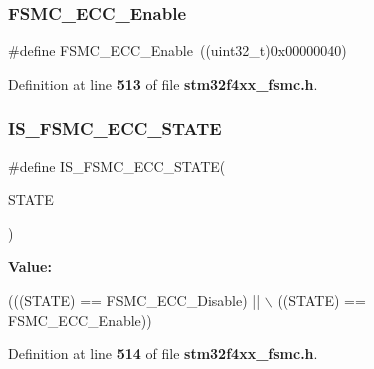 \subsubsection{F\+S\+M\+C\+\_\+\+E\+C\+C\+\_\+\+Enable}
{\footnotesize\ttfamily \#define F\+S\+M\+C\+\_\+\+E\+C\+C\+\_\+\+Enable~((uint32\+\_\+t)0x00000040)}



Definition at line \textbf{ 513} of file \textbf{ stm32f4xx\+\_\+fsmc.\+h}.

\mbox{\label{group__FSMC__ECC_gaf1a7cb45edd8707bf4ea8aac96799c77}} 
\subsubsection{I\+S\+\_\+\+F\+S\+M\+C\+\_\+\+E\+C\+C\+\_\+\+S\+T\+A\+TE}
{\footnotesize\ttfamily \#define I\+S\+\_\+\+F\+S\+M\+C\+\_\+\+E\+C\+C\+\_\+\+S\+T\+A\+TE(\begin{DoxyParamCaption}\item[{}]{S\+T\+A\+TE }\end{DoxyParamCaption})}

{\bfseries Value\+:}
\begin{DoxyCode}
(((STATE) == FSMC_ECC_Disable) || \(\backslash\)
                                  ((STATE) == FSMC_ECC_Enable))
\end{DoxyCode}


Definition at line \textbf{ 514} of file \textbf{ stm32f4xx\+\_\+fsmc.\+h}.


